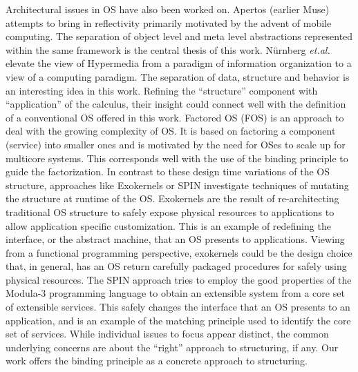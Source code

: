\documentclass[draft]{article}
\def\etal{{\it et.al.}\ }
\begin{document}
Architectural issues in OS have also been worked on.  Apertos (earlier
Muse)
\cite{Yokote:1992:ARO:141936.141970,Yokote:1991:MOA:122120.122122,Yokote:1992:NSO:506378.506427}
attempts to  bring in reflectivity \cite{Smith:1984:RSL:800017.800513}
primarily motivated by the advent of mobile computing.  The separation
of  object level and  meta level  abstractions represented  within the
same framework is  the central thesis of this  work.  N\"urnberg \etal
\cite{Nurnberg:1996:HOS:234828.234847} elevate  the view of Hypermedia
from a paradigm  of information organization to a  view of a computing
paradigm.   The  separation of  data,  structure  and  behavior is  an
interesting idea  in this work.  Refining  the ``structure'' component
with ``application''  of the   calculus, their  insight could
connect well with the definition  of a conventional OS offered in this
work.  Factored  OS (FOS) \cite{Wentzlaff:2009:FOS:1531793.1531805} is
an approach to deal with the growing complexity of OS.  It is based on
factoring a component (service) into  smaller ones and is motivated by
the need for OSes to scale up for multicore systems.  This corresponds
well with the use of the binding principle to guide the factorization.
In  contrast to  these design  time  variations of  the OS  structure,
approaches like Exokernels or  SPIN investigate techniques of mutating
the    structure     at    runtime    of     the    OS.     Exokernels
\cite{Engler:1995:EOS:224056.224076} are the result of re-architecting
traditional  OS  structure  to  safely expose  physical  resources  to
applications to allow application  specific customization.  This is an
example of redefining the interface,  or the abstract machine, that an
OS presents  to applications.   Viewing from a  functional programming
perspective, exokernels  could be the design choice  that, in general,
has  an  OS return  carefully  packaged  procedures  for safely  using
physical  resources.   The SPIN  \cite{Bershad:1995:ESP:224057.224077}
approach  tries  to  employ   the  good  properties  of  the  Modula-3
programming language to obtain an extensible system from a core set of
extensible  services.  This safely  changes the  interface that  an OS
presents  to  an  application,  and  is an  example  of  the  matching
principle used to identify the core set of services.  While individual
issues to  focus appear distinct,  the common underlying  concerns are
about the ``right'' approach to  structuring, if any.  Our work offers
the binding principle as a concrete approach to structuring.
\end{document}
